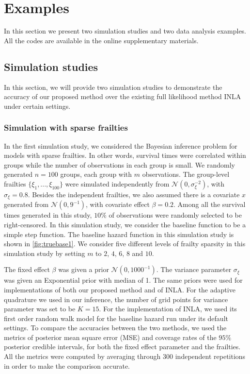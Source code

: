 \documentclass[ba]{imsart}
\begin{document}
\section{Examples}\label{sec:example}

In this section we present two simulation studies and two data analysis examples. All the codes are available in the online supplementary materials.

\subsection{Simulation studies}\label{subsec:sim}
In this section, we will provide two simulation studies to demonstrate the accuracy of our proposed method over the existing full likelihood method INLA under certain settings.

\subsubsection{Simulation with sparse frailties}\label{subsubsec:sim1}

In the first simulation study, we considered the Bayesian inference problem for models with sparse frailties. In other words, survival times were correlated within groups while the number of observations in each group is small. We randomly generated $n = 100$ groups, each group with $m$ observations. The group-level frailties $\{\xi_1,...,\xi_{100}\}$ were simulated independently from $\mathcal{N}(0,\sigma_\xi^{-2})$, with $\sigma_{\xi} = 0.8$. Besides the independent frailties, we also assumed there is a covariate $x$ generated from $\mathcal{N}(0,9^{-1})$, with covariate effect $\beta = 0.2$. Among all the survival times generated in this study, $10\%$ of observations were randomly selected to be right-censored. In this simulation study, we consider the baseline function to be a simple step function. The baseline hazard function in this simulation study is shown in \ref{fig:truebase1}. We consider five different levels of frailty sparsity in this simulation study by setting $m$ to $2$, $4$, $6$, $8$ and $10$.

The fixed effect $\beta$ was given a prior $\mathcal{N}(0,1000^{-1})$. The variance parameter $\sigma_\xi$ was given an Exponential prior with median of 1. The same priors were used for implementations of both our proposed method and of INLA. For the adaptive quadrature we used in our inference, the number of grid points for variance parameter was set to be $K = 15$. For the implementation of INLA, we used its first order random walk model for the baseline hazard run under its default settings. To compare the accuracies between the two methods, we used the metrics of posterior mean square error (MSE) and coverage rates of the $95\%$ posterior credible intervals, for both the fixed effect parameter and the frailties. All the metrics were computed by averaging through 300 independent repetitions in order to make the comparison accurate. 
\end{document}
